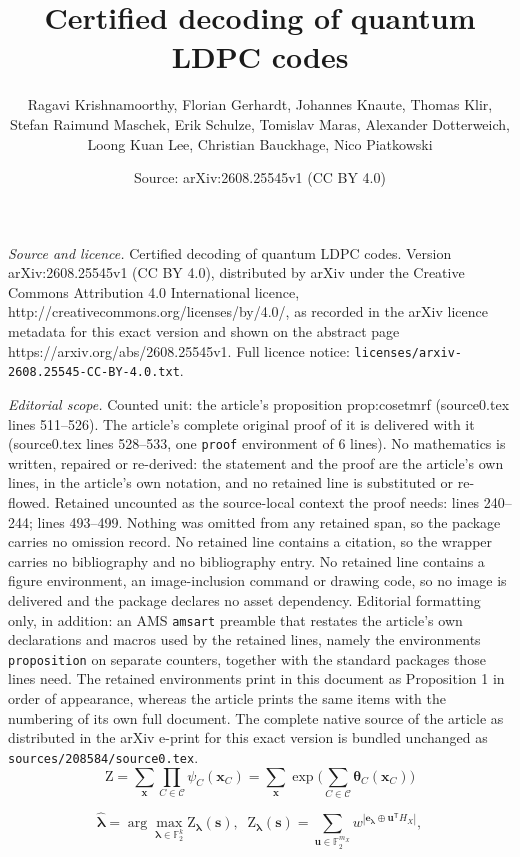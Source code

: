 \documentclass[10pt,a4paper]{amsart}
\title{Certified decoding of quantum LDPC codes}
\author{Ragavi Krishnamoorthy, Florian Gerhardt, Johannes Knaute, Thomas Klir, Stefan Raimund Maschek, Erik Schulze, Tomislav Maras, Alexander Dotterweich, Loong Kuan Lee, Christian Bauckhage, Nico Piatkowski}
\date{Source: arXiv:2608.25545v1 (CC BY 4.0)}
\newcommand{\F}{\mathbb{F}}
\newcommand{\Z}{\mathrm{Z}}
\newcommand{\ve}{\boldsymbol{e}}
\newcommand{\vlam}{\boldsymbol{\lambda}}
\newcommand{\vs}{\boldsymbol{s}}
\newcommand{\vtheta}{\boldsymbol{\theta}}
\newcommand{\vu}{\boldsymbol{u}}
\newcommand{\vx}{\boldsymbol{x}}
\begin{document}
\maketitle

\noindent\emph{Source and licence.} Certified decoding of quantum LDPC codes. Version arXiv:2608.25545v1 (CC BY 4.0), distributed by arXiv under the Creative Commons Attribution 4.0 International licence, http://creativecommons.org/licenses/by/4.0/, as recorded in the arXiv licence metadata for this exact version and shown on the abstract page https://arxiv.org/abs/2608.25545v1. Full licence notice: \texttt{licenses/arxiv-2608.25545-CC-BY-4.0.txt}.\par\smallskip

\noindent\textit{Editorial scope.} Counted unit: the article's proposition prop:cosetmrf (source0.tex lines 511--526). The article's complete original proof of it is delivered with it (source0.tex lines 528--533, one \texttt{proof} environment of 6 lines). No mathematics is written, repaired or re-derived: the statement and the proof are the article's own lines, in the article's own notation, and no retained line is substituted or re-flowed.  Retained uncounted as the source-local context the proof needs: lines 240--244; lines 493--499.  Nothing was omitted from any retained span, so the package carries no omission record.  No retained line contains a citation, so the wrapper carries no bibliography and no bibliography entry.  No retained line contains a figure environment, an image-inclusion command or drawing code, so no image is delivered and the package declares no asset dependency.  Editorial formatting only, in addition: an AMS \texttt{amsart} preamble that restates the article's own declarations and macros used by the retained lines, namely the environments \texttt{proposition} on separate counters, together with the standard packages those lines need.  The retained environments print in this document as Proposition 1 in order of appearance, whereas the article prints the same items with the numbering of its own full document.  The complete native source of the article as distributed in the arXiv e-print for this exact version is bundled unchanged as \texttt{sources/208584/source0.tex}.
\begin{equation}
\Z=\sum_{\vx}\prod_{C\in\mathcal{C}}\psi_C(\vx_C)
 =\sum_{\vx}\exp\!\Big(\textstyle\sum_{C\in\mathcal{C}}\vtheta_C(\vx_C)\Big)
\label{eq:Z}
\end{equation}

\begin{equation}
\hat{\vlam}=\arg\max_{\vlam\in\F_2^k}\Z_{\vlam}(\vs),
\;\;
\Z_{\vlam}(\vs)=\sum_{\vu\in\F_2^{m_X}}
   w^{|\ve_{\vlam}\oplus\vu^{\mathsf{T}}H_X|},
\label{eq:cosetZ}
\end{equation}
\end{document}
